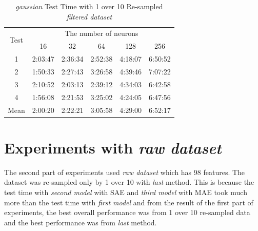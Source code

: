 \documentclass[draft,dvipsnames]{drexel-thesis}
\begin{document}
\begin{thesis}
\begin{table}[!t]
\centering
\caption{{\em gaussian} Test Time with 1 over 10 Re-sampled {\em filtered dataset}}
\label{tbl:gaussian_1_10_time}
\begin{tabular}{|c|c|c|c|c|c|}
\hline
\multirow{2}{*}{Test}      & \multicolumn{5}{c|}{The number of neurons}                                                                                                               \\ \cline{2-6}
                           & 16                           & 32                           & 64                           & 128                          & 256                          \\ \hline
1                          & 2:03:47                      & 2:36:34                      & 2:52:38                      & 4:18:07                      & 6:50:52                      \\ \hline
2                          & 1:50:33                      & 2:27:43                      & 3:26:58                      & 4:39:46                      & 7:07:22                      \\ \hline
3                          & 2:10:52                      & 2:03:13                      & 2:39:12                      & 4:34:03                      & 6:42:58                      \\ \hline
4                          & 1:56:08                      & 2:21:53                      & 3:25:02                      & 4:24:05                      & 6:47:56                      \\ \hline
\multicolumn{1}{|l|}{Mean} & \multicolumn{1}{l|}{2:00:20} & \multicolumn{1}{l|}{2:22:21} & \multicolumn{1}{l|}{3:05:58} & \multicolumn{1}{l|}{4:29:00} & \multicolumn{1}{l|}{6:52:17} \\ \hline
\end{tabular}
\end{table}


\section{Experiments with {\em raw dataset}}
The second part of experiments used {\em raw dataset} which has 98 features. The dataset was re-sampled only by 1 over 10 with {\em last} method. This is because the test time with {\em second model} with SAE and {\em third model} with MAE took much more than the test time with {\em first model} and from the result of the first part of experiments, the best overall performance was from 1 over 10 re-sampled data and the best performance was from {\em last} method.


\end{thesis}
\end{document}
